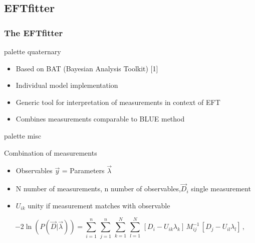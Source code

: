 \documentclass{beamer}
\begin{document}
\subsection{EFTfitter}
\begin{frame}
		\frametitle{The EFTfitter}
		\vspace{-6mm}
	\begin{beamercolorbox}[rounded=true,shadow=true]{palette quaternary}
		\begin{itemize}
		\vspace{-3mm}
		\item Based on BAT (Bayesian Analysis Toolkit) [1]
		\item Individual model implementation
		\item Generic tool for interpretation of measurements in context of EFT
		\item Combines measurements comparable to BLUE method
		\vspace{-1mm}
		\end{itemize}
	\end{beamercolorbox}
	\begin{beamercolorbox}[rounded=true,shadow=true]{palette misc}
		\begin{minipage}[b]{0.80\textwidth}
			Combination of measurements
			\begin{itemize}
			\item Observables $\vec{y}$ = Parameters $\vec{\lambda}$
			\item N number of measurements, n number of observables,$\vec{D}_i$ single measurement
			\item $U_{ik}$ unity if measurement matches with observable
			\end{itemize}
			\end{minipage}\vspace{-3mm}
			\begin{equation*}
				-2 \ln{(P(\vec{D}|\vec{\lambda}))} = \sum_{i=1}^{n} \, \sum_{j=1}^{n} \, \sum_{k=1}^{N} \, \sum_{l=1}^{N} \, [D_i - U_{ik} \lambda_k] \, M_{ij}^{-1} \, [D_j - U_{il} \lambda_l] \, ,
			\label{eqn:min}
			\end{equation*}\vspace{-3mm}
		\hfill
		\begin{minipage}[t]{0.15\textwidth} \vspace{-7.8cm} 
			\hspace{-1cm}

\end{minipage}
\end{beamercolorbox}
\end{frame}
\end{document}
